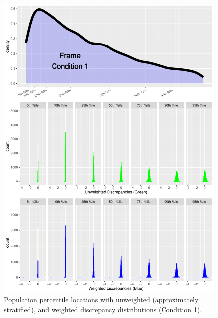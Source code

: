 \documentclass[
  ,man]{apa7}
\begin{document}
\begin{figure}
\centering
\includegraphics{NormsBuilding_files/figure-latex/Figure3-1.pdf}
\caption{\label{fig:Figure3}Population percentile locations with unweighted (approximately stratified), and weighted discrepancy distributions (Condition 1).}
\end{figure}
\end{document}
